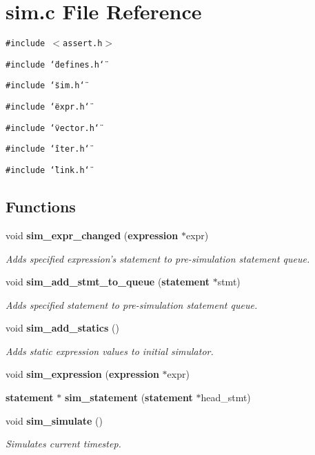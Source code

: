 \section{sim.c File Reference}
\label{sim_8c}
{\tt \#include $<$assert.h$>$}\par
{\tt \#include \char`\"{}defines.h\char`\"{}}\par
{\tt \#include \char`\"{}sim.h\char`\"{}}\par
{\tt \#include \char`\"{}expr.h\char`\"{}}\par
{\tt \#include \char`\"{}vector.h\char`\"{}}\par
{\tt \#include \char`\"{}iter.h\char`\"{}}\par
{\tt \#include \char`\"{}link.h\char`\"{}}\par
\subsection*{Functions}
\begin{CompactItemize}
\item 
void {\bf sim\_\-expr\_\-changed} ({\bf expression} $\ast$expr)
\begin{CompactList}\small\item\em Adds specified expression's statement to pre-simulation statement queue.\item\end{CompactList}\item 
void {\bf sim\_\-add\_\-stmt\_\-to\_\-queue} ({\bf statement} $\ast$stmt)
\begin{CompactList}\small\item\em Adds specified statement to pre-simulation statement queue.\item\end{CompactList}\item 
void {\bf sim\_\-add\_\-statics} ()
\begin{CompactList}\small\item\em Adds static expression values to initial simulator.\item\end{CompactList}\item 
void {\bf sim\_\-expression} ({\bf expression} $\ast$expr)
\item 
{\bf statement} $\ast$ {\bf sim\_\-statement} ({\bf statement} $\ast$head\_\-stmt)
\item 
void {\bf sim\_\-simulate} ()
\begin{CompactList}\small\item\em Simulates current timestep.\item\end{CompactList}\end{CompactItemize}
